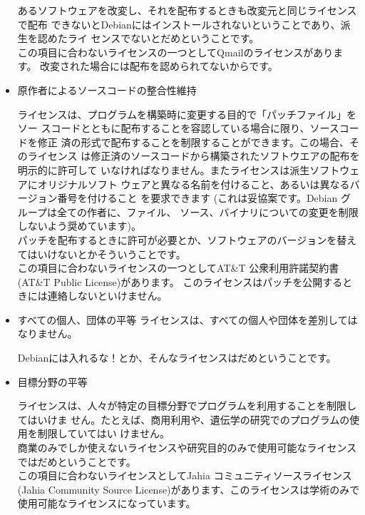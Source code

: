 \documentclass[mingoth,a4paper]{jsarticle}
\begin{document}
\begin{itemize}
あるソフトウェアを改変し、それを配布するときも改変元と同じライセンスで配布
できないとDebianにはインストールされないということであり、派生を認めたライ
センスでないとだめということです。
\\

この項目に合わないライセンスの一つとしてQmailのライセンスがあります。
改変された場合には配布を認められてないからです。
	  
 \item 原作者によるソースコードの整合性維持

ライセンスは、プログラムを構築時に変更する目的で「パッチファイル」をソー
スコードとともに配布することを容認している場合に限り、ソースコードを修正
済の形式で配布することを制限することができます。この場合、そのライセンス
は修正済のソースコードから構築されたソフトウエアの配布を明示的に許可して
いなければなりません。またライセンスは派生ソフトウェアにオリジナルソフト
ウェアと異なる名前を付けること、あるいは異なるバージョン番号を付けること
を要求できます (これは妥協案です。Debian グループは全ての作者に、ファイル、
ソース、バイナリについての変更を制限しないよう奨めています)。
\\

パッチを配布するときに許可が必要とか、ソフトウェアのバージョンを替えてはいけないとかそういうことです。
\\

この項目に合わないライセンスの一つとしてAT\&T 公衆利用許諾契約書 (AT\&T Public License)があります。
このライセンスはパッチを公開するときには連絡しないといけません。

 \item すべての個人、団体の平等
ライセンスは、すべての個人や団体を差別してはなりません。

Debianには入れるな！とか、そんなライセンスはだめということです。


 \item 目標分野の平等

ライセンスは、人々が特定の目標分野でプログラムを利用することを制限してはいけま
せん。たとえば、商用利用や、遺伝学の研究でのプログラムの使用を制限していてはい
けません。
\\

商業のみでしか使えないライセンスや研究目的のみで使用可能なライセンスではだめということです。
\\

この項目に合わないライセンスとしてJahia コミュニティソースライセンス (Jahia Community Source License)があります、このライセンスは学術のみで使用可能なライセンスになっています。
	  

\end{itemize}
\end{document}
